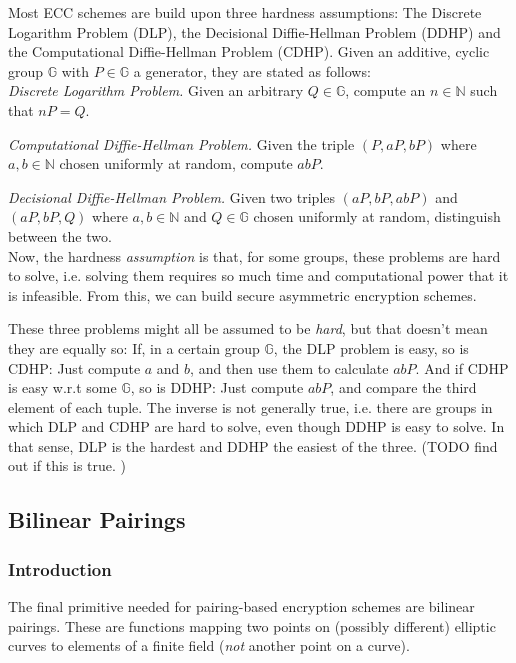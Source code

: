 Most ECC schemes are build upon three hardness assumptions: The Discrete Logarithm Problem (DLP), the Decisional Diffie-Hellman Problem (DDHP) and the Computational Diffie-Hellman Problem (CDHP).
Given an additive, cyclic group $\mathbb{G}$ with $P \in \mathbb{G}$ a generator, they are stated as follows:
\\

\emph{Discrete Logarithm Problem.} Given an arbitrary $Q \in \mathbb{G}$, compute an $n \in \mathbb{N}$ such that $n P = Q$. %

\emph{Computational Diffie-Hellman Problem.} Given the triple $(P, aP, bP)$ where $a, b \in \mathbb{N}$ chosen uniformly at random, compute $abP$.

\emph{Decisional Diffie-Hellman Problem.} Given two triples $(aP, bP, abP)$ and $(aP, bP, Q)$ where $a, b \in \mathbb{N}$ and $Q \in \mathbb{G}$ chosen uniformly at random, distinguish between the two.
\\

Now, the hardness \emph{assumption} is that, for some groups, these problems are hard to solve, i.e. solving them requires so much time and computational power that it is infeasible.
From this, we can build secure asymmetric encryption schemes.

These three problems might all be assumed to be \emph{hard}, but that doesn't mean they are equally so:
If, in a certain group $\mathbb{G}$, the DLP problem is easy, so is CDHP: Just compute $a$ and $b$, and then use them to calculate $abP$.
And if CDHP is easy w.r.t some $\mathbb{G}$, so is DDHP: Just compute $abP$, and compare the third element of each tuple.
The inverse is not generally true, i.e. there are groups in which DLP and CDHP are hard to solve, even though DDHP is easy to solve.
In that sense, DLP is the hardest and DDHP the easiest of the three. \cite{katz_introduction_2015} (TODO find out if this is true. \cite{menezes_introduction_2009})

\subsection{Bilinear Pairings}
\subsubsection{Introduction}
The final primitive needed for pairing-based encryption schemes are bilinear pairings. These are functions mapping two points on (possibly different) elliptic curves to elements of a finite field (\emph{not} another point on a curve).\cite{blake_advances_2005}

